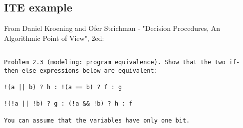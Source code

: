 \subsection{\ac{ITE} example}

From Daniel Kroening and Ofer Strichman - "Decision Procedures, An Algorithmic Point of View", 2ed:

\begin{lstlisting}

Problem 2.3 (modeling: program equivalence). Show that the two if-then-else expressions below are equivalent:

!(a || b) ? h : !(a == b) ? f : g

!(!a || !b) ? g : (!a && !b) ? h : f

You can assume that the variables have only one bit.

\end{lstlisting}



